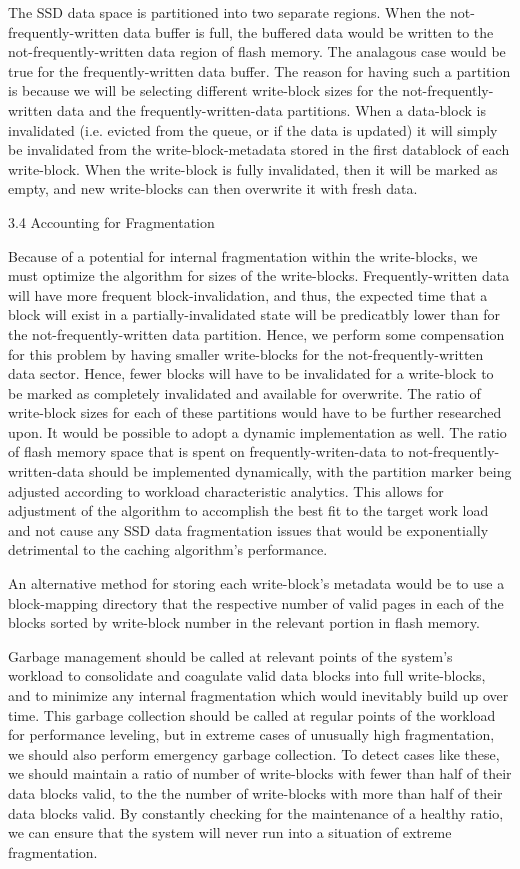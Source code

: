 \documentclass[11pt]{article}
\begin{document}
The SSD data space is partitioned into two separate regions. When the not-frequently-written data buffer is full, the buffered data would be written to the not-frequently-written data region of flash memory. The analagous case would be true for the frequently-written data buffer. The reason for having such a partition is because we will be selecting different write-block sizes for the not-frequently-written data and the frequently-written-data partitions. When a data-block is invalidated (i.e. evicted from the queue, or if the data is updated) it will simply be invalidated from the write-block-metadata stored in the first datablock of each write-block. When the write-block is fully invalidated, then it will be marked as empty, and new write-blocks can then overwrite it with fresh data. 

3.4 Accounting for Fragmentation

Because of a potential for internal fragmentation within the write-blocks, we must optimize the algorithm for sizes of the write-blocks. Frequently-written data will have more frequent block-invalidation, and thus, the expected time that a block will exist in a partially-invalidated state will be predicatbly lower than for the not-frequently-written data partition. Hence, we perform some compensation for this problem by having smaller write-blocks for the not-frequently-written data sector. Hence, fewer blocks will have to be invalidated for a write-block to be marked as completely invalidated and available for overwrite. The ratio of write-block sizes for each of these partitions would have to be further researched upon. It would be possible to adopt a dynamic implementation as well. The ratio of flash memory space that is spent on frequently-writen-data to not-frequently-written-data should be implemented dynamically, with the partition marker being adjusted according to workload characteristic analytics. This allows for adjustment of the algorithm to accomplish the best fit to the target work load and not cause any SSD data fragmentation issues that would be exponentially detrimental to the caching algorithm's performance.

An alternative method for storing each write-block's metadata would be to use a block-mapping directory that the respective number of valid pages in each of the blocks sorted by write-block number in the relevant portion in flash memory.

Garbage management should be called at relevant points of the system's workload to consolidate and coagulate valid data blocks into full write-blocks, and to minimize any internal fragmentation which would inevitably build up over time. This garbage collection should be called at regular points of the workload for performance leveling, but in extreme cases of unusually high fragmentation, we should also perform emergency garbage collection. To detect cases like these, we should maintain a ratio of number of write-blocks with fewer than half of their data blocks valid, to the the number of write-blocks with more than half of their data blocks valid. By constantly checking for the maintenance of a healthy ratio, we can ensure that the system will never run into a situation of extreme fragmentation.
\end{document}
